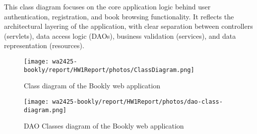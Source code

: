 This class diagram focuses on the core application logic behind user authentication, registration, and book browsing functionality. It reflects the architectural layering of the application, with clear separation between controllers (servlets), data access logic (DAOs), business validation (services), and data representation (resources).



\begin{figure}[h]
    \centering
    \texttt{[image: wa2425-bookly/report/HW1Report/photos/ClassDiagram.png]}
    \caption{Class diagram of the Bookly web application}
    \label{fig:classdiagram}
\end{figure}

\begin{figure}[h]
    \centering
    \texttt{[image: wa2425-bookly/report/HW1Report/photos/dao-class-diagram.png]}
    \caption{DAO Classes diagram of the Bookly web application}
    \label{fig:daoclassdiagram}
\end{figure}